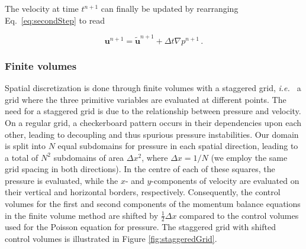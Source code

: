 \documentclass[final,3p,twocolumn]{elsarticle}
\begin{document}
The velocity at time $t^{n+1}$ can finally be updated by rearranging Eq.\
\eqref{eq:secondStep} to read 

\begin{equation}
    \bm{u}^{n+1} = \tilde{\bm{u}}^{n+1} + \Delta t \nabla p^{n+1} \,. 
    \label{eq:velocityUpdate}
\end{equation}

\subsubsection{Finite volumes}

Spatial discretization is done through finite volumes with a staggered grid,
{\em i.e.\ } a grid where the three primitive variables are evaluated at
different points.  The need for a staggered grid is due to the relationship
between pressure and velocity. On a regular grid, a checkerboard pattern occurs
in their dependencies upon each other, leading to decoupling and thus spurious
pressure instabilities.  Our domain is split into $N$ equal subdomains for
pressure in each spatial direction, leading to a total of $N^2$ subdomains of
area $\Delta x^2$, where $\Delta x = 1/N$ (we employ the same grid spacing in
both directions). In the centre of each of these squares, the pressure is
evaluated, while the $x$- and $y$-components of velocity are evaluated on their
vertical and horizontal borders, respectively.  Consequently, the control
volumes for the first and second components of the momentum balance equations
in the finite volume method are shifted by $\frac{1}{2} \Delta x$ compared to
the control volumes used for the Poisson equation for pressure. The staggered
grid with shifted control volumes is illustrated in Figure
\ref{fig:staggeredGrid}.
\end{document}
